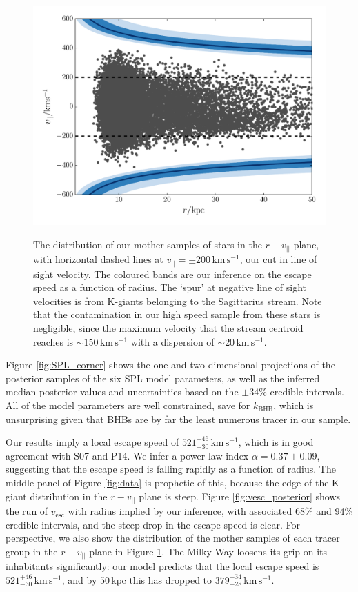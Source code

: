 \documentclass[useAMS,twocolumn,usenatbib]{mn2e}
\def\kpc{{\,\mathrm{kpc}}}
\def\kms{{\,\mathrm{km\,s^{-1}}}}
\def\vlos{{v_{||}}}
\def\vesc{{v_\mathrm{esc}}}
\begin{document}
\begin{figure}
\includegraphics[width=\columnwidth]{plots/stars_bound}\\
\caption{The distribution of our mother samples of stars in the $r-\vlos$ plane, with horizontal dashed lines at $\vlos = \pm 200\kms$, our cut in line of sight velocity. 
The coloured bands are our inference on the escape speed as a function of radius.
The `spur' at negative line of sight velocities is from K-giants belonging to the Sagittarius stream. 
Note that the contamination in our high speed sample from these stars is negligible, since the maximum velocity that the stream centroid reaches is $\sim 150\kms$ \citep{Be14} with a dispersion of $\sim 20\kms$.}
\label{fig:stars_bound}
\end{figure}

Figure \ref{fig:SPL_corner} shows the one and two dimensional projections of the posterior samples of the six SPL model parameters, as well as the inferred median posterior values and uncertainties based on the $\pm 34\%$ credible intervals. 
All of the model parameters are well constrained, save for $k_\mathrm{BHB}$, which is unsurprising given that BHBs are by far the least numerous tracer in our sample.

Our results imply a local escape speed of $521^{+46}_{-30}\kms$, which is in good agreement with S07 and P14.  
We infer a power law index $\alpha = 0.37\pm0.09$, suggesting that the escape speed is falling rapidly as a function of radius.
The middle panel of Figure \ref{fig:data} is prophetic of this, because the edge of the K-giant distribution in the $r-\vlos$ plane is steep.
Figure \ref{fig:vesc_posterior} shows the run of $\vesc$ with radius implied by our inference, with associated 68\% and 94\% credible intervals, and the steep drop in the escape speed is clear.
For perspective, we also show the distribution of the mother samples of each tracer group in the $r-\vlos$ plane in Figure \ref{fig:stars_bound}.
The Milky Way loosens its grip on its inhabitants significantly: our model predicts that the local escape speed is $521^{+46}_{-30}\kms$, and by $50\kpc$ this has dropped to $379^{+34}_{-28}\kms$.
\end{document}
